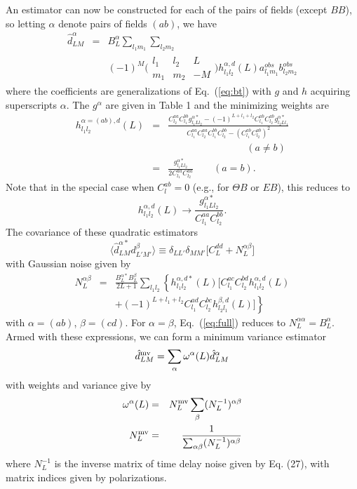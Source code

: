 \documentclass[prl,amsmath,amssymb,floatfix,superscriptaddress,nofootinbib,twocolumn]{revtex4-1}
\def\be{\begin{equation}}
\def\ee{\end{equation}}
\def\bea{\begin{eqnarray}}
\def\eea{\end{eqnarray}}
\newcommand{\vs}{\nonumber\\}
\newcommand{\ec}[1]{Eq.~(\ref{eq:#1})}
\newcommand{\eql}[1]{\label{eq:#1}}
\begin{document}
An estimator can now be constructed for each of the pairs of fields (except $BB$), so letting $\alpha$ denote pairs of fields $(ab)$, we have
\bea
\hat{d}^{\alpha}_{LM} &=&\nonumber B_{L}^{\alpha}\sum_{l_{1}m_{1}}\sum_{l_{2}m_{2}} \\
&& (-1)^{M}\bigl(\begin{smallmatrix} l_1 & l_2 & L \\ m_1 & m_2 & -M  \end{smallmatrix}\bigr) h^{\alpha,d}_{l_{1}l_{2}}(L) a^{obs}_{l_{1}m_{1}}b^{obs}_{l_{2}m_{2}}
\eea
where the coefficients are generalizations of \ec{bt} with $g$ and $h$ acquiring superscripts $\alpha$. The $g^\alpha$ are given in Table 1 and the minimizing weights are
\bea
h^{\alpha=(ab),d}_{l_{1}l_{2}}(L) 
&=& \frac{C_{l_{2}}^{aa}C_{l_{1}}^{bb}g^{\alpha*}_{l_{1}Ll_{2}}-(-1)^{L+l_{1}+l_{2}}C_{l_{1}}^{ab}C_{l_{2}}^{ab}g^{\alpha*}_{l_{2}Ll_{1}}}{C_{l_{1}}^{aa}C_{l_{2}}^{aa}C_{l_{1}}^{bb}C_{l_{2}}^{bb}-(C_{l_{1}}^{ab}C_{l_{2}}^{ab})^{2}}\vs && \qquad\qquad \qquad\qquad (a\ne b)
\vs
&=&  \frac{g^{\alpha *}_{l_{1}Ll_{2}}}{2C_{l_{1}}^{aa}C_{l_{2}}^{aa}}\qquad(a= b).
\eea
Note that in the special case when $C_{l}^{ab}=0$ (e.g., for $\Theta B$ or $EB$), this reduces to 
\be
h^{\alpha,d}_{l_{1}l_{2}}(L) \rightarrow \frac{g^{\alpha *}_{l_{1}Ll_{2}}}{C_{l_{1}}^{aa}C_{l_{2}}^{bb}}. 
\ee
The covariance of these quadratic estimators
\be
\langle \hat{d}^{\alpha*}_{LM}d^{\beta}_{L'M'}\rangle \equiv \delta_{LL'}\delta_{MM'}\big[ C_{L}^{dd}+N_{L}^{\alpha \beta} \big]
\ee
with Gaussian noise given by
\bea
N_{L}^{\alpha\beta}&=&\frac{B_{L}^{\alpha*}B_{L}^{\beta}}{2L+1}\sum_{l_{1}l_{2}}  \left\{ h_{l_{1}l_{2}}^{\alpha,d*} (L)\big[ C_{l_{1}}^{ac}C_{l_{2}}^{bd}h_{l_{1}l_{2}}^{\alpha,d}(L)\right. \nonumber \\
&&\left. +(-1)^{L+l_{1}+l_{2}}C_{l_{1}}^{ad}C_{l_{2}}^{bc} h_{l_{2}l_{1}}^{\beta,d}(L)  \big]\right\}\eql{full}
\eea
with $\alpha=(ab)$, $\beta=(cd)$. For $\alpha=\beta$, \ec{full} reduces to $N_{L}^{\alpha\alpha}=B_{L}^{\alpha}$.
Armed with these expressions, we can form a minimum variance estimator
\be
\hat{d}^{\rm mv}_{LM} = \sum_{\alpha}\omega^{\alpha}(L)\hat{d}^{\alpha}_{LM}
\ee
with weights and variance give by
\bea
\omega^{\alpha}(L) & =&N^{\rm mv}_{L} \sum_{\beta}(N_{L}^{-1})^{\alpha \beta} \\
N^{\rm mv}_{L} &=& \frac{1}{\sum_{\alpha\beta} (N_{L}^{-1})^{\alpha \beta}}
\eea
where $N_{L}^{-1}$ is the inverse matrix of time delay noise given by Eq. (27), with matrix indices given by polarizations. 
\end{document}
